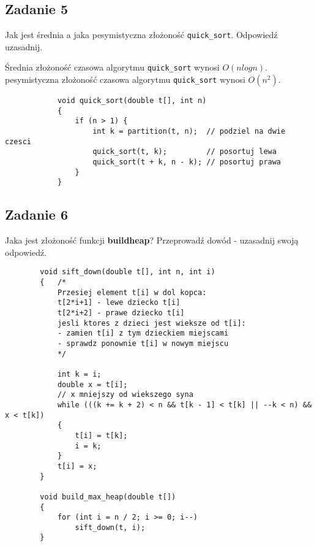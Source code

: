 \documentclass{article}
\begin{document}
    \pagebreak

    \subsection*{Zadanie 5}
    Jak jest średnia a jaka pesymistyczna złożoność \verb+quick_sort+. Odpowiedź uzasadnij.

    \begin{center}
    Średnia złożoność czasowa algorytmu \verb+quick_sort+ wynosi $O(nlogn)$. \\
    pesymistyczna złożoność czasowa algorytmu \verb+quick_sort+ wynosi $O(n^2)$. \\
    \end{center}

    \begin{lstlisting}
            void quick_sort(double t[], int n)
            {
                if (n > 1) {
                    int k = partition(t, n);  // podziel na dwie czesci
                    quick_sort(t, k);         // posortuj lewa
                    quick_sort(t + k, n - k); // posortuj prawa
                }
            }
    \end{lstlisting}

    \subsection*{Zadanie 6}
    Jaka jest złożoność funkcji \textbf{buildheap}? Przeprowadź dowód - uzasadnij swoją odpowiedź.

    \begin{lstlisting}
        void sift_down(double t[], int n, int i)
        {   /*
            Przesiej element t[i] w dol kopca:
            t[2*i+1] - lewe dziecko t[i]
            t[2*i+2] - prawe dziecko t[i]
            jesli ktores z dzieci jest wieksze od t[i]:
            - zamien t[i] z tym dzieckiem miejscami
            - sprawdz ponownie t[i] w nowym miejscu
            */

            int k = i;
            double x = t[i];
            // x mniejszy od wiekszego syna
            while (((k += k + 2) < n && t[k - 1] < t[k] || --k < n) && x < t[k]) 
            {
                t[i] = t[k];
                i = k;
            }
            t[i] = x;
        }

        void build_max_heap(double t[])
        {
            for (int i = n / 2; i >= 0; i--)
                sift_down(t, i);
        }
    \end{lstlisting}
\end{document}
